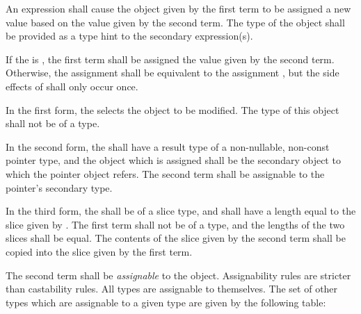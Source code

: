 \specsubsubitem
An  expression shall cause the object given by the
first term to be assigned a new value based on the value given by the second
term. The type of the object shall be provided as a type hint to the secondary
expression(s).

\specsubsubitem
If the  is \terminal{=}, the first term shall be
assigned the value given by the second term. Otherwise, the assignment
 shall be
equivalent to the assignment
,
but the side effects of  shall only occur once.

\specsubsubitem
In the first form, the  selects the object to be
modified. The type of this object shall not be of a  type.

\specsubsubitem
In the second form, the  shall have a result type
of a non-nullable, non-const pointer type, and the object which is assigned
shall be the secondary object to which the pointer object refers. The second
term shall be assignable to the pointer's secondary type.

\specsubsubitem
In the third form, the  shall be of a slice
type, and shall have a length equal to the slice given by
. The first term shall not be of a
 type, and the lengths of the two slices shall be equal. The
contents of the slice given by the second term shall be copied into the slice
given by the first term.

\specsubsubitem
The second term shall be \textit{assignable} to the object. Assignability rules
are stricter than castability rules. All types are assignable to themselves. The
set of other types which are assignable to a given type are given by the
following table:

